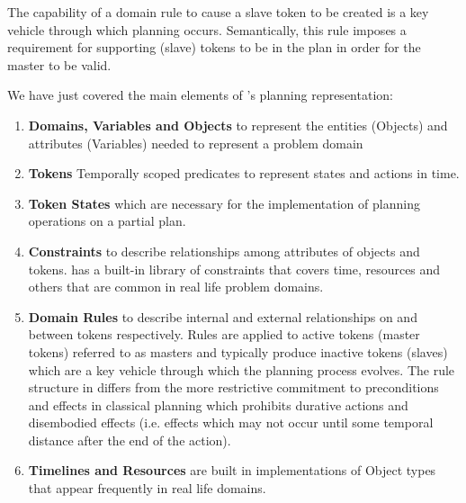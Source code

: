 \begin{description}
The capability of a domain rule to cause a slave token to be created
is a key vehicle through which planning occurs. Semantically, this
rule imposes a requirement for supporting (slave) tokens to be in the plan in
order for the master to be valid. 



\end{description}

We have just covered the main elements of \eu's planning representation:

\begin{enumerate}
   \item \textbf{Domains, Variables and Objects} to represent the entities (Objects) and attributes (Variables) needed to represent a problem domain	
    \item \textbf{Tokens} Temporally scoped predicates to represent states and actions in time. 
    \item \textbf{Token States} which are necessary for the implementation of planning operations on a partial plan.
    \item \textbf{Constraints} to describe relationships among attributes of objects and tokens. \eu has a built-in library of constraints that covers time, resources and others that are common in real life problem domains.
    \item \textbf{Domain Rules} to describe internal and external relationships on and
     between tokens respectively. Rules are applied to active tokens (master tokens) 
     referred to as masters and typically produce inactive tokens (slaves) which are a key vehicle through which the planning
     process evolves. The rule structure in \eu differs from the more restrictive commitment to preconditions and effects in classical
     planning which prohibits durative actions and disembodied effects (i.e. effects which may not occur until some temporal distance after
     the end of the action).    
    \item \textbf{Timelines and Resources} are built in implementations of Object types that appear frequently in real life domains.
\end{enumerate}



